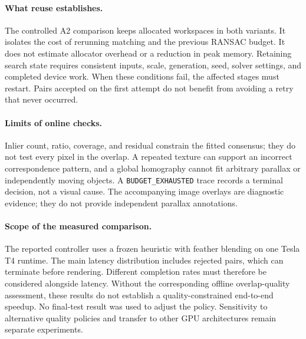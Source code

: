 \paragraph{What reuse establishes.}
The controlled A2 comparison keeps allocated workspaces in both variants.
It isolates the cost of rerunning matching and the previous RANSAC budget.
It does not estimate allocator overhead or a reduction in peak memory.
Retaining search state requires consistent inputs, scale, generation, seed,
solver settings, and completed device work. When these conditions fail,
the affected stages must restart. Pairs accepted on the first attempt do
not benefit from avoiding a retry that never occurred.

\paragraph{Limits of online checks.}
Inlier count, ratio, coverage, and residual constrain the fitted consensus;
they do not test every pixel in the overlap. A repeated texture can support
an incorrect correspondence pattern, and a global homography cannot fit
arbitrary parallax or independently moving objects. A
\texttt{BUDGET\_EXHAUSTED} trace records a terminal decision, not a visual
cause. The accompanying image overlays are diagnostic evidence; they do
not provide independent parallax annotations.

\paragraph{Scope of the measured comparison.}
The reported controller uses a frozen heuristic with feather blending on
one Tesla T4 runtime. The main latency distribution includes rejected
pairs, which can terminate before rendering. Different completion rates
must therefore be considered alongside latency. Without the corresponding
offline overlap-quality assessment, these results do not establish a
quality-constrained end-to-end speedup. No final-test result was used to
adjust the policy. Sensitivity to alternative quality policies and transfer
to other GPU architectures remain separate experiments.
